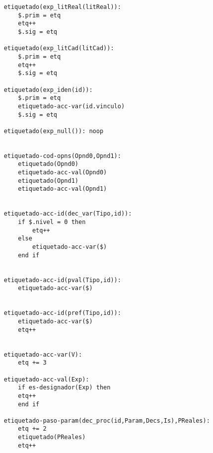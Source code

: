 \begin{lstlisting}
    etiquetado(exp_litReal(litReal)):
        $.prim = etq
        etq++
        $.sig = etq

    etiquetado(exp_litCad(litCad)):
        $.prim = etq
        etq++
        $.sig = etq

    etiquetado(exp_iden(id)):
        $.prim = etq
        etiquetado-acc-var(id.vinculo)
        $.sig = etq

    etiquetado(exp_null()): noop


    etiquetado-cod-opns(Opnd0,Opnd1):
        etiquetado(Opnd0)
        etiquetado-acc-val(Opnd0)
        etiquetado(Opnd1)
        etiquetado-acc-val(Opnd1)

        
    etiquetado-acc-id(dec_var(Tipo,id)):
        if $.nivel = 0 then
            etq++
        else
            etiquetado-acc-var($)
        end if

        
    etiquetado-acc-id(pval(Tipo,id)):
        etiquetado-acc-var($)

        
    etiquetado-acc-id(pref(Tipo,id)):
        etiquetado-acc-var($)
        etq++

        
    etiquetado-acc-var(V):
        etq += 3

    etiquetado-acc-val(Exp):
        if es-designador(Exp) then
        etq++
        end if

    etiquetado-paso-param(dec_proc(id,Param,Decs,Is),PReales):
        etq += 2
        etiquetado(PReales)
        etq++


\end{lstlisting}
